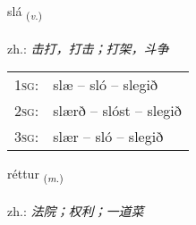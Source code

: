 \documentclass[frontgrid, backgrid]{flacards}\usepackage[]{graphicx}\usepackage[]{xcolor}
\begin{document}
\renewcommand{\flhead}{\vskip5pt \fboxsep=0pt {\small\bfseries\footnotesize Sagnorð | 动词}}
\renewcommand{\fcfoot}{\vskip5pt \fboxsep=0pt \hspace{2pt}{\small\bfseries\footnotesize 1K}}

\renewcommand{\blhead}{\vskip5pt {\small\bfseries\footnotesize Sagnorð | 动词 }}
\renewcommand{\bcfoot}{\vskip5pt \hspace{2pt}{\small\bfseries\footnotesize 1K}}


{slá \small{\textsubscript{(\textit{v.})}} \\[1ex] %
\textphonetic{[stlauː]} \\
zh.: \emph{击打，打击；打架，斗争} \\  [2ex]
\renewcommand*{\arraystretch}{0.8}
\begin{tabular}{p{1cm}l}
\textsc{1sg}: & slæ -- sló -- slegið \\ 
\textsc{2sg}: & slærð -- slóst -- slegið \\ 
\textsc{3sg}: & slær -- sló -- slegið \\ 
\end{tabular}
}

\renewcommand{\flhead}{\vskip5pt \fboxsep=0pt {\small\bfseries\footnotesize Nafnorð | 名词}}
\renewcommand{\fcfoot}{\vskip5pt \fboxsep=0pt \hspace{2pt}{\small\bfseries\footnotesize 1K}}

\renewcommand{\blhead}{\vskip5pt {\small\bfseries\footnotesize Nafnorð | 名词 }}
\renewcommand{\bcfoot}{\vskip5pt \hspace{2pt}{\small\bfseries\footnotesize 1K}}


{réttur \small{\textsubscript{(\textit{m.})}} \\[1ex] %
\textphonetic{[rjɛhtʏr]} \\
zh.: \emph{法院；权利；一道菜} \\  [2ex]
\renewcommand*{\arraystretch}{0.8}
}
\end{document}
